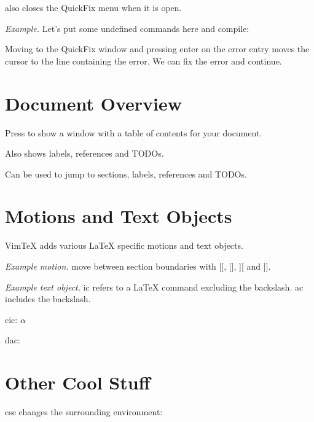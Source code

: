 \le also closes the QuickFix menu when it is open.

\emph{Example.} Let's put some undefined commands here and compile:

Moving to the QuickFix window and pressing enter on the error entry moves the
cursor to the line containing the error. We can fix the error and continue.










\section{Document Overview}

Press \lt to show a window with a table of contents for your document.

Also shows labels, references and TODOs. 

Can be used to jump to sections, labels, references and TODOs.















\section{Motions and Text Objects}

VimTeX adds various LaTeX specific motions and text objects.

\emph{Example motion.} move between section boundaries with [[, [], ][ and ]].

\emph{Example text object.} ic refers to a LaTeX command excluding the
backslash. ac includes the backslash.

cic: \( \alpha \)

dac: \(  \)











\section{Other Cool Stuff}

cse changes the surrounding environment:

